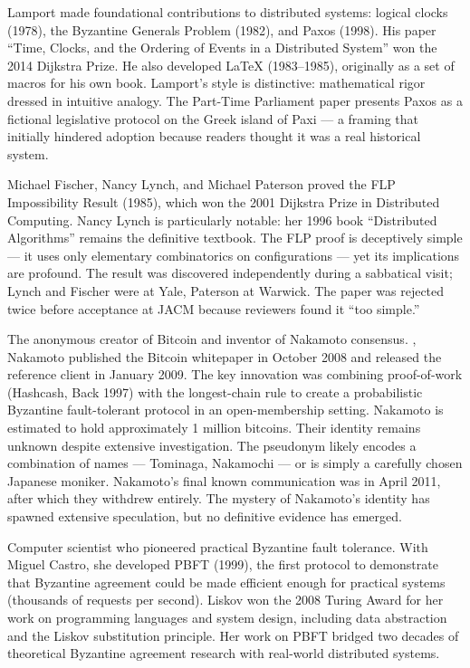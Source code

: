 Lamport made foundational contributions to distributed systems: logical clocks (1978), the Byzantine Generals Problem (1982), and Paxos (1998). His paper ``Time, Clocks, and the Ordering of Events in a Distributed System'' won the 2014 Dijkstra Prize. He also developed LaTeX (1983--1985), originally as a set of macros for his own book. Lamport's style is distinctive: mathematical rigor dressed in intuitive analogy. The Part-Time Parliament paper presents Paxos as a fictional legislative protocol on the Greek island of Paxi — a framing that initially hindered adoption because readers thought it was a real historical system.

Michael Fischer, Nancy Lynch, and Michael Paterson proved the FLP Impossibility Result (1985), which won the 2001 Dijkstra Prize in Distributed Computing. Nancy Lynch is particularly notable: her 1996 book ``Distributed Algorithms'' remains the definitive textbook. The FLP proof is deceptively simple — it uses only elementary combinatorics on configurations — yet its implications are profound. The result was discovered independently during a sabbatical visit; Lynch and Fischer were at Yale, Paterson at Warwick. The paper was rejected twice before acceptance at JACM because reviewers found it ``too simple.''

The anonymous creator of Bitcoin and inventor of Nakamoto consensus. \cite{nakamoto2008}, Nakamoto published the Bitcoin whitepaper in October 2008 and released the reference client in January 2009. The key innovation was combining proof-of-work (Hashcash, Back 1997) with the longest-chain rule to create a probabilistic Byzantine fault-tolerant protocol in an open-membership setting. Nakamoto is estimated to hold approximately 1 million bitcoins. Their identity remains unknown despite extensive investigation. The pseudonym likely encodes a combination of names — Tominaga, Nakamochi — or is simply a carefully chosen Japanese moniker. Nakamoto's final known communication was in April 2011, after which they withdrew entirely. The mystery of Nakamoto's identity has spawned extensive speculation, but no definitive evidence has emerged.

Computer scientist who pioneered practical Byzantine fault tolerance. With Miguel Castro, she developed PBFT (1999), the first protocol to demonstrate that Byzantine agreement could be made efficient enough for practical systems (thousands of requests per second). Liskov won the 2008 Turing Award for her work on programming languages and system design, including data abstraction and the Liskov substitution principle. Her work on PBFT bridged two decades of theoretical Byzantine agreement research with real-world distributed systems.

